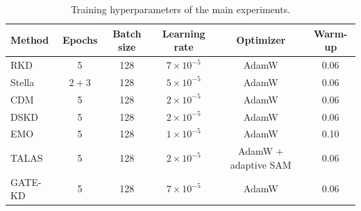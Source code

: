 \begin{table}[t]
    \caption{Training hyperparameters of the main experiments.}
    \label{tab:training-hyperparameters}
    \tablebody
    \begin{tabular}{@{}lccccc@{}}
        \toprule
        Method & Epochs & Batch size & Learning rate & Optimizer & Warm-up \\
        \midrule
        RKD     & 5     & 128 & $7\times10^{-5}$ & AdamW & 0.06 \\
        Stella  & $2+3$ & 128 & $5\times10^{-5}$ & AdamW & 0.06 \\
        CDM     & 5     & 128 & $2\times10^{-5}$ & AdamW & 0.06 \\
        DSKD    & 5     & 128 & $2\times10^{-5}$ & AdamW & 0.06 \\
        EMO     & 5     & 128 & $1\times10^{-5}$ & AdamW & 0.10 \\
        TALAS   & 5     & 128 & $2\times10^{-5}$ & AdamW + adaptive SAM & 0.06 \\
        GATE-KD & 5     & 128 & $7\times10^{-5}$ & AdamW & 0.06 \\
        \bottomrule
    \end{tabular}
\end{table}
